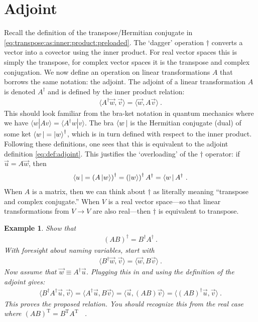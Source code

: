 \documentclass[
  11pt,
	colorful,
	raggedright,
]{tufte-style-thesis-flip}
\newtheorem{example}{Example}[section]
\begin{document}
\section{Adjoint}

Recall the definition of the transpose/Hermitian conjugate in \eqref{eq:transpose:as:inner:product:preloaded}. The `dagger' operation $\dag$ converts a vector into a covector using the inner product. For real vector spaces this is simply the transpose, for complex vector spaces it is the transpose and complex conjugation. We now define an operation on linear transformations $A$ that borrows the same notation: the adjoint. The adjoint of a linear transformation $A$ is denoted $A^\dag$ and is defined by the inner product relation:
\begin{align}
  \langle A^\dag \vec{w}, \vec{v} \rangle = \langle \vec{w}, A\vec{v}\rangle \ .
  \label{eq:def:adjoint}
\end{align}
This should look familiar from the bra-ket notation in quantum mechanics where we have $\langle w|A v\rangle = \langle A^\dag w|v\rangle$. The bra $\left\langle w\,\right|$ is the Hermitian conjugate (dual) of some ket $\left\langle w\,\right| = \left|w\right\rangle^\dag$, which is in turn defined with respect to the inner product. Following these definitions, one sees that this is equivalent to the adjoint definition \eqref{eq:def:adjoint}. This justifies the `overloading' of the $\dag$ operator: if $\vec{u} = A\vec{w}$, then
\begin{align}
  \left\langle u\,\right| = \left(A \left|w\right\rangle\right)^\dag = \left(\left|w\right\rangle\right)^\dag A^\dag = \left\langle w\,\right| A^\dag \ .
\end{align}
When $A$ is a matrix, then we can think about $\dag$ as literally meaning ``transpose and complex conjugate.'' When $V$ is a real vector space---so that linear transformations from $V\to V$ are also real---then $\dag$ is equivalent to transpose. 
\begin{example}
Show that 
\begin{align}
  \left(AB\right)^\dag = B^\dag A^\dag \ .
\end{align}
With foresight about naming variables, start with
\begin{align}
  \langle B^\dag \vec{w}, \vec{v}\rangle = \langle \vec{w}, B \vec{v} \rangle \ .
\end{align}
Now assume that $\vec{w} \equiv A^\dag \vec{u}$. Plugging this in and using the definition of the adjoint gives:
\begin{align}
  \langle B^\dag A^\dag \vec{u}, \vec{v}\rangle 
  = \langle A^\dag \vec{u}, B \vec{v} \rangle 
  = \langle \vec{u},  (AB) \vec{v} \rangle 
  = \langle (AB)^\dag \vec{u},   \vec{v} \rangle 
  \ .
\end{align}
This proves the proposed relation. You should recognize this from the real case where $(AB)^\text{T} = B^\text{T}A^\text{T}$ \ .
\end{example}
\end{document}
